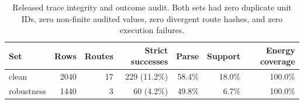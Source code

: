 \begin{table}[t]
\caption{Released trace integrity and outcome audit. Both sets had zero duplicate unit IDs, zero non-finite audited values, zero divergent route hashes, and zero execution failures.}
\label{tab:trace-integrity}
\centering
\small
\begin{tabular}{@{}lrrrrrr@{}}
\toprule
Set & Rows & Routes & Strict successes & Parse & Support & Energy coverage \\
\midrule
clean & 2040 & 17 & 229 (11.2\%) & 58.4\% & 18.0\% & 100.0\% \\
robustness & 1440 & 3 & 60 (4.2\%) & 49.8\% & 6.7\% & 100.0\% \\
\bottomrule
\end{tabular}
\end{table}
